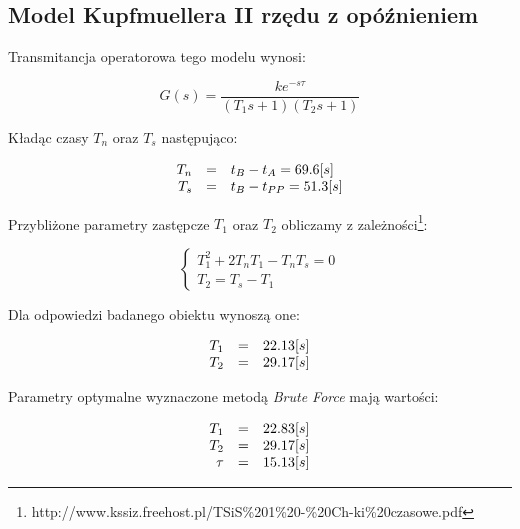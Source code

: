 \documentclass[12pt]{article}
\begin{document}
\newpage

\subsection{Model Kupfmuellera II rzędu z opóźnieniem}

Transmitancja operatorowa tego modelu wynosi:

\begin{equation}
	G(s)=\frac{ke^{-s\tau}}{(T_1s+1)(T_2s+1)}
	\label{equ:trankup2}
\end{equation}

Kładąc czasy $T_n$ oraz $T_s$ następująco: 

\begin{equation*}
\begin{array}{r c l}
	T_n&=&t_B-t_A=69.6[s] \\
	T_s&=&t_B-t_{PP}=51.3[s] 
\end{array}
\end{equation*}

Przybliżone parametry zastępcze $T_1$ oraz $T_2$ obliczamy z zależności\footnote{
http://www.kssiz.freehost.pl/TSiS\%201\%20-\%20Ch-ki\%20czasowe.pdf}:

\begin{equation*}
	\begin{cases}
		T_1^2+2T_nT_1-T_nT_s=0 \\
		T_2=T_s-T_1
	\end{cases}
\end{equation*}

Dla odpowiedzi badanego obiektu wynoszą one:

\begin{equation*}
	\begin{array}{r c l}
		T_1&=&22.13[s] \\
		T_2&=&29.17[s] 
	\end{array}
\end{equation*}

Parametry optymalne wyznaczone metodą \textit{Brute Force} mają wartości:

\begin{equation*}
	\begin{array}{r c l}
		T_1&=&22.83[s] \\
		T_2&=&29.17[s] \\
		\tau&=&15.13[s]
	\end{array}
\end{equation*}

\newpage
\end{document}
